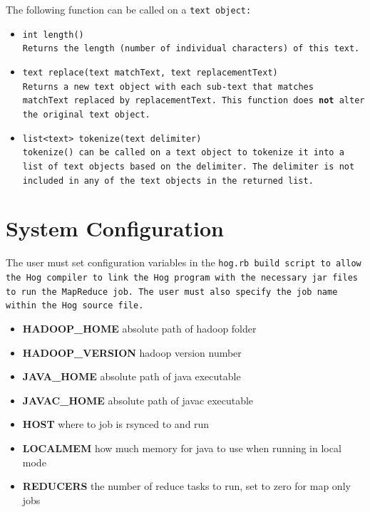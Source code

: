 \documentclass{report}
\begin{document}
The following function can be called on a \tt text \rm object:

\begin{itemize}

\item[] \tt int length() \rm \\

Returns the length (number of individual characters) of this \tt text\rm.

\item[] \tt text replace(text matchText, text replacementText) \rm \\

Returns a new \tt text \rm object with each sub-\tt text \rm that matches \tt
matchText \rm replaced by \tt replacementText\rm. This function does \textbf{not}
alter the original \tt text \rm object.

\item[] \tt list<text> tokenize(text delimiter) \rm \\

\tt tokenize() \rm can be called on a \tt text \rm object to tokenize it into a
list of \tt text \rm objects based on the delimiter. The delimiter is not included
in any of the \tt text \rm objects in the returned list.

\end{itemize}




\section{System Configuration} %
\label{sec:system_configuration}

The user must set configuration variables in the \tt hog.rb \rm build script to
allow the Hog compiler to link the Hog program with the necessary jar files to run
the MapReduce job. The user must also specify the job name within the Hog source
file.

\begin{itemize}

\item[] \textbf{HADOOP\_HOME} absolute path of hadoop folder
\item[] \textbf{HADOOP\_VERSION} hadoop version number
\item[] \textbf{JAVA\_HOME} absolute path of java executable
\item[] \textbf{JAVAC\_HOME} absolute path of javac executable
\item[] \textbf{HOST} where to job is rsynced to and run
\item[] \textbf{LOCALMEM} how much memory for java to use when running in local mode 
\item[] \textbf{REDUCERS} the number of reduce tasks to run, set to zero for map only jobs

\end{itemize}
\end{document}

